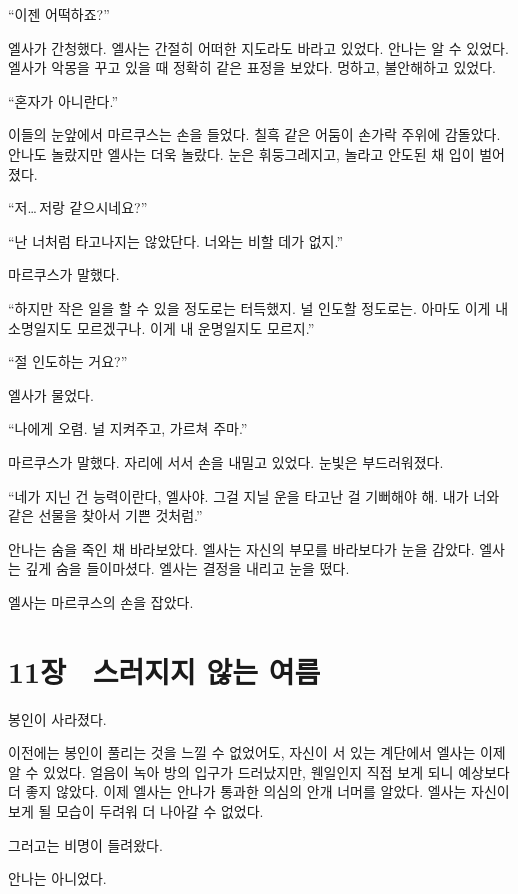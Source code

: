 ``이젠 어떡하죠?''

엘사가 간청했다. 엘사는 간절히 어떠한 지도라도 바라고 있었다. 안나는 알 수 있었다. 엘사가 악몽을 꾸고 있을 때 정확히 같은 표정을 보았다. 멍하고, 불안해하고 있었다.

`` 혼자가 아니란다.''

이들의 눈앞에서 마르쿠스는 손을 들었다. 칠흑 같은 어둠이 손가락 주위에 감돌았다. 안나도 놀랐지만 엘사는 더욱 놀랐다. 눈은 휘둥그레지고, 놀라고 안도된 채 입이 벌어졌다.

``저\ldots\,저랑 같으시네요?''

``난 너처럼 타고나지는 않았단다. 너와는 비할 데가 없지.''

마르쿠스가 말했다.

``하지만 작은 일을 할 수 있을 정도로는 터득했지. 널 인도할 정도로는. 아마도 이게 내 소명일지도 모르겠구나. 이게 내 운명일지도 모르지.''

``절 인도하는 거요?''

엘사가 물었다.

``나에게 오렴. 널 지켜주고, 가르쳐 주마.''

마르쿠스가 말했다. 자리에 서서 손을 내밀고 있었다. 눈빛은 부드러워졌다.

``네가 지닌 건 능력이란다, 엘사야. 그걸 지닐 운을 타고난 걸 기뻐해야 해. 내가 너와 같은 선물을 찾아서 기쁜 것처럼.''

안나는 숨을 죽인 채 바라보았다. 엘사는 자신의 부모를 바라보다가 눈을 감았다. 엘사는 깊게 숨을 들이마셨다. 엘사는 결정을 내리고 눈을 떴다.

엘사는 마르쿠스의 손을 잡았다.



\chapter[11장  스러지지 않는 여름][11장\hspace*{.5em}스러지지 않는 여름]{11장 \ 스러지지 않는 여름}



봉인이 사라졌다.

이전에는 봉인이 풀리는 것을 느낄 수 없었어도, 자신이 서 있는 계단에서 엘사는 이제 알 수 있었다. 얼음이 녹아 방의 입구가 드러났지만, 웬일인지 직접 보게 되니 예상보다 더 좋지 않았다. 이제 엘사는 안나가 통과한 의심의 안개 너머를 알았다. 엘사는 자신이 보게 될 모습이 두려워 더 나아갈 수 없었다.

그러고는 비명이 들려왔다.

안나는 아니었다.

